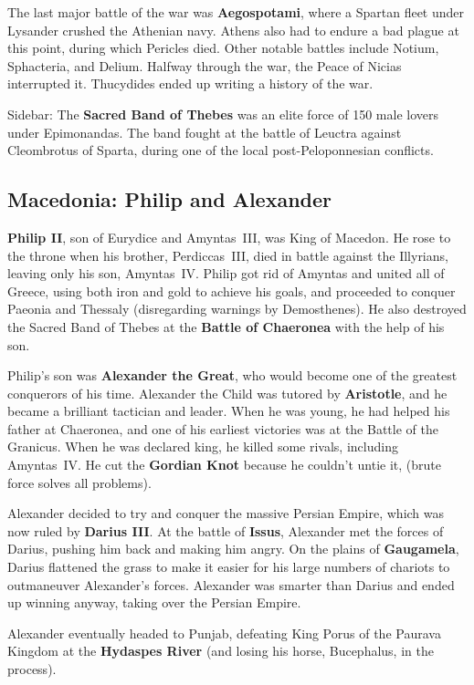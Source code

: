 The last major battle of the war was \textbf{Aegospotami},
where a Spartan fleet under Lysander crushed the Athenian navy.
Athens also had to endure a bad plague at this point, during which Pericles died.
Other notable battles include Notium, Sphacteria, and Delium.
Halfway through the war, the Peace of Nicias interrupted it.
Thucydides ended up writing a history of the war.

Sidebar: The \textbf{Sacred Band of Thebes} was an elite force of 150 male lovers under Epimonandas.
The band fought at the battle of Leuctra against Cleombrotus of Sparta,
during one of the local post-Peloponnesian conflicts.

\subsection*{Macedonia: Philip and Alexander}

\textbf{Philip II}, son of Eurydice and Amyntas~III, was King of Macedon.
He rose to the throne when his brother, Perdiccas~III,
died in battle against the Illyrians, leaving only his son, Amyntas~IV\@.
Philip got rid of Amyntas and united all of Greece,
using both iron and gold to achieve his goals,
and proceeded to conquer Paeonia and Thessaly (disregarding warnings by Demosthenes).
He also destroyed the Sacred Band of Thebes at the \textbf{Battle of Chaeronea} with the help of his son.

Philip's son was \textbf{Alexander the Great}, who would become one of the greatest conquerors of his time.
Alexander the Child was tutored by \textbf{Aristotle}, and he became a brilliant tactician and leader.
When he was young, he had helped his father at Chaeronea,
and one of his earliest victories was at the Battle of the Granicus.
When he was declared king, he killed some rivals, including Amyntas~IV\@.
He cut the \textbf{Gordian Knot} because he couldn't untie it,
(brute force solves all problems).

Alexander decided to try and conquer the massive Persian Empire, which was now ruled by \textbf{Darius III}\@.
At the battle of \textbf{Issus}, Alexander met the forces of Darius, pushing him back and making him angry.
On the plains of \textbf{Gaugamela},
Darius flattened the grass to make it easier for his large numbers of chariots to outmaneuver Alexander's forces.
Alexander was smarter than Darius and ended up winning anyway, taking over the Persian Empire.

Alexander eventually headed to Punjab,
defeating King Porus of the Paurava Kingdom at the \textbf{Hydaspes River}
(and losing his horse, Bucephalus, in the process).


